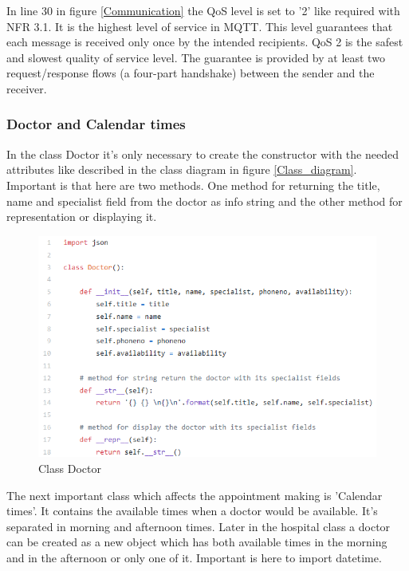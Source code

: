 In line 30 in figure \ref{Communication} the QoS level is set to '2' like required with NFR 3.1. It is the highest level of service in MQTT. This level guarantees that each message is received only once by the intended recipients. QoS 2 is the safest and slowest quality of service level. The guarantee is provided by at least two request/response flows (a four-part handshake) between the sender and the receiver.

\subsubsection{Doctor and Calendar times}
In the class Doctor it's only necessary to create the constructor with the needed attributes like described in the class diagram in figure \ref{Class_diagram}. Important is that here are two methods. One method for returning the title, name and specialist field from the doctor as info string and the other method for representation or displaying it. 

\begin{figure}
\centering
\sidecaption
\includegraphics[scale=.65]{images/melanie_images/Doctor.png}
\caption{Class Doctor}
\label{Doctor}
\end{figure}

The next important class which affects the appointment making is 'Calendar times'. It contains the available times when a doctor would be available. It's separated in morning and afternoon times. Later in the hospital class a doctor can be created as a new object which has both available times in the morning and in the afternoon or only one of it. Important is here to import datetime.


